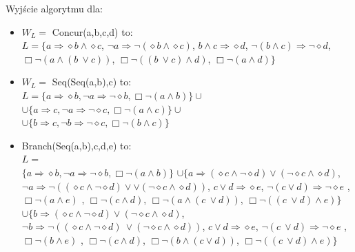 \documentclass[a4paper, 11pt]{article}
\begin{document}
	Wyjście algorytmu dla:
	\begin{itemize}
	\item $W_L= $ Concur(a,b,c,d) to:\\
	$L= \{ a   \Rightarrow     \diamond b   \wedge    \diamond c $,
		$	  \neg a   \Rightarrow     \neg (  \diamond b   \wedge    \diamond c)$,
			$ b   \wedge   c    \Rightarrow    \diamond d$,
			$  \neg (b   \wedge   c)    \Rightarrow     \neg   \diamond d$,
			$  \Box   \neg (a   \wedge   (b \  \vee   c))$,
			$  \Box   \neg ((b \  \vee   c)   \wedge   d)$,
			$  \Box   \neg (a   \wedge   d)\}$
	
	\item 	$W_L=$ Seq(Seq(a,b),c) to: \\
	$ L=\{  a \Rightarrow \diamond b , \neg a\Rightarrow \neg \diamond b, \Box \neg (a \wedge  b)\} \cup $ \\
	$ \cup \{ a \Rightarrow c , \neg a\Rightarrow \neg \diamond c, \Box\neg (a \wedge  c)\} \cup $\\
	$ \cup \{ b \Rightarrow c , \neg b\Rightarrow \neg \diamond c, \Box \neg (b \wedge  c)\} $
	
	\item Branch(Seq(a,b),c,d,e) to:\\
	$ L=$\\$ \{  a \Rightarrow \diamond b , \neg a\Rightarrow \neg \diamond b, \Box \neg (a \wedge  b)\} $ 
	$\cup 	\{	  a    \Rightarrow    ( \diamond c   \wedge    \neg   \diamond d)   \vee   ( \neg   \diamond c   \wedge    \diamond d)$,
			  $ \neg a    \Rightarrow     \neg (( \diamond c   \wedge    \neg   \diamond d)  \vee  \vee ( \neg   \diamond c   \wedge    \diamond d))$,
			 $ c  \vee d    \Rightarrow     \diamond e $,
			  $ \neg (c  \vee   d)    \Rightarrow    \neg   \diamond e$ ,
			   $\Box   \neg (a   \wedge   e)$ ,
			   $\Box   \neg (c   \wedge   d)$,
			   $\Box   \neg (a   \wedge   (c \  \vee   d))$,
			   $\Box   \neg ((c \  \vee   d)   \wedge   e)\} $			  
	$\cup 	\{	  b    \Rightarrow    ( \diamond c   \wedge    \neg   \diamond d)   \vee   ( \neg   \diamond c   \wedge    \diamond d)$,
			  $ \neg b    \Rightarrow     \neg (( \diamond c   \wedge    \neg   \diamond d) \  \vee   ( \neg   \diamond c   \wedge    \diamond d))$,
			 $ c  \vee   d    \Rightarrow     \diamond e $,
			  $ \neg (c \  \vee   d)    \Rightarrow    \neg   \diamond e$ ,
			   $\Box   \neg (b   \wedge   e)$ ,
			   $\Box   \neg (c   \wedge   d)$,
			   $\Box   \neg (b   \wedge   (c   \vee   d))$,
			   $\Box   \neg ((c \  \vee   d)   \wedge   e)\}$
			 		   		
	\end{itemize}
\end{document}
